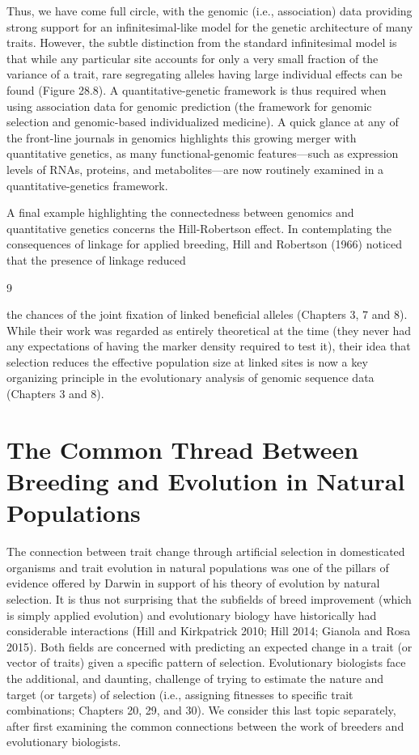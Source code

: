 \documentclass{article}
\begin{document}
Thus, we have come full circle, with the genomic (i.e., association) data providing strong support for an infinitesimal-like model for the genetic architecture of many traits. However, the subtle distinction from the standard infinitesimal model is that while any particular site accounts for only a very small fraction of the variance of a trait, rare segregating alleles having large individual effects can be found (Figure 28.8). A quantitative-genetic framework is thus required when using association data for genomic prediction (the framework for genomic selection and genomic-based individualized medicine). A quick glance at any of the front-line journals in genomics highlights this growing merger with quantitative genetics, as many functional-genomic features—such as expression levels of RNAs, proteins, and metabolites—are now routinely examined in a quantitative-genetics framework.

A final example highlighting the connectedness between genomics and quantitative genetics concerns the Hill-Robertson effect. In contemplating the consequences of linkage for applied breeding, Hill and Robertson (1966) noticed that the presence of linkage reduced

9

the chances of the joint fixation of linked beneficial alleles (Chapters 3, 7 and 8). While their work was regarded as entirely theoretical at the time (they never had any expectations of having the marker density required to test it), their idea that selection reduces the effective population size at linked sites is now a key organizing principle in the evolutionary analysis of genomic sequence data (Chapters 3 and 8).

\section{The Common Thread Between Breeding and Evolution in Natural Populations}
The connection between trait change through artificial selection in domesticated organisms and trait evolution in natural populations was one of the pillars of evidence offered by Darwin in support of his theory of evolution by natural selection. It is thus not surprising that the subfields of breed improvement (which is simply applied evolution) and evolutionary biology have historically had considerable interactions (Hill and Kirkpatrick 2010; Hill 2014; Gianola and Rosa 2015). Both fields are concerned with predicting an expected change in a trait (or vector of traits) given a specific pattern of selection. Evolutionary biologists face the additional, and daunting, challenge of trying to estimate the nature and target (or targets) of selection (i.e., assigning fitnesses to specific trait combinations; Chapters 20, 29, and 30). We consider this last topic separately, after first examining the common connections between the work of breeders and evolutionary biologists.
\end{document}
